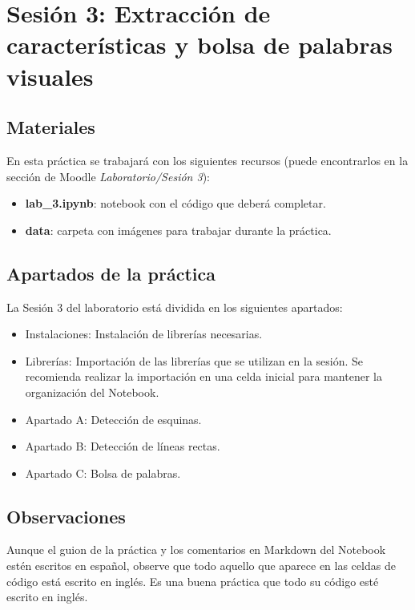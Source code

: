 \chapter{Sesión 3: Extracción de características y bolsa de palabras visuales}
\label{chapter:introduction_ses_3}

\section{Materiales}

En esta práctica se trabajará con los siguientes recursos (puede encontrarlos en la sección de Moodle \textit{Laboratorio/Sesión 3}):

\begin{itemize}
    \item \textbf{lab\_3.ipynb}: notebook con el código que deberá completar.
    \item \textbf{data}: carpeta con imágenes para trabajar durante la práctica.
\end{itemize}

\section{Apartados de la práctica}

La Sesión 3 del laboratorio está dividida en los siguientes apartados:

\begin{itemize}
    \item Instalaciones: Instalación de librerías necesarias.
    \item Librerías: Importación de las librerías que se utilizan en la sesión. Se recomienda realizar la importación en una celda inicial para mantener la organización del Notebook.
    \item Apartado A: Detección de esquinas.
    \item Apartado B: Detección de líneas rectas.
    \item Apartado C: Bolsa de palabras.
\end{itemize}

\section{Observaciones}

Aunque el guion de la práctica y los comentarios en Markdown del Notebook estén escritos en español, observe que todo aquello que aparece en las celdas de código está escrito en inglés. Es una buena práctica que todo su código esté escrito en inglés.


